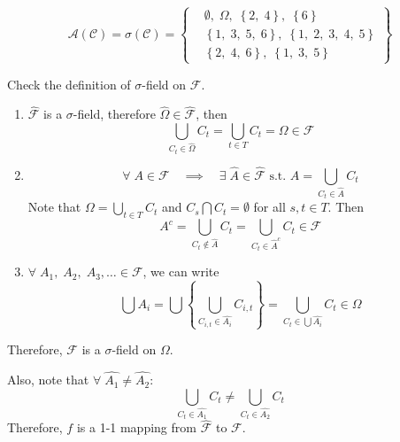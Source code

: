 \begin{list}{1.9.}{}
\item
  \[
    \mathcal{A}\left(\mathcal{C}\right) = \sigma\left(\mathcal{C}\right) =
    \left\{
      \begin{aligned}
        & \emptyset,\; \Omega,\; \left\{2,\; 4\right\},\; \left\{6\right\}    \\
        & \left\{1,\; 3,\; 5,\; 6\right\},\; \left\{1,\; 2,\; 3,\; 4,\; 5\right\}    \\
        & \left\{2,\; 4,\; 6\right\},\; \left\{1,\; 3,\; 5\right\}
      \end{aligned}
    \right\}
  \]
  
\item Check the definition of $\sigma$-field on $\mathcal{F}$.
  \begin{enumerate}
  \item $\hat{\mathcal{F}}$ is a $\sigma$-field, therefore $\hat{\Omega}\in\hat{\mathcal{F}}$, then
    \[
      \bigcup\limits_{C_t\in\hat{\Omega}}C_t = \bigcup\limits_{t\in T}C_t = \Omega \in \mathcal{F}
    \]
    
  \item
    \[
      \forall\; A \in \mathcal{F}
      \quad\implies\quad
      \exists\; \hat{A}\in\hat{\mathcal{F}} \text{ s.t. } A = \bigcup\limits_{C_t\in\hat{A}}C_t
    \]
    Note that $\Omega = \bigcup\limits_{t\in T}C_t $ and $C_s \bigcap C_t = \emptyset$ for all $s,t\in T$. Then
    \[
      A^c = \bigcup\limits_{C_t\notin \hat{A}}C_t = \bigcup\limits_{C_t\in\hat{A}^c} C_t \in \mathcal{F}
    \]
    
  \item $\forall\; A_1,\; A_2,\; A_3,\dots\in\mathcal{F}$, we can write
    \[
      \bigcup A_i = \bigcup\left\{
        \bigcup\limits_{C_{i,t}\in\hat{A_i}}C_{i,t}
      \right\}
      = \bigcup\limits_{C_t\in\bigcup \hat{A_i}}C_t
      \in \Omega
    \]
  \end{enumerate}
  Therefore, $\mathcal{F}$ is a $\sigma$-field on $\Omega$.
  \par
  Also, note that $\forall\;\hat{A_1} \neq \hat{A_2}$:
  \[
    \bigcup_{C_t\in\hat{A_1}}C_t \neq \bigcup\limits_{C_t\in\hat{A_2}}C_t
  \]
  Therefore, $f$ is a 1-1 mapping from $\hat{\mathcal{F}}$ to $\mathcal{F}$.
  

\end{list}
